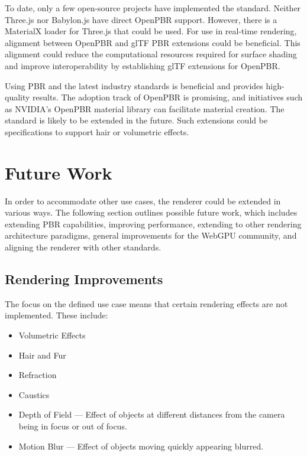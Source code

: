 To date, only a few open-source projects have implemented the standard. Neither \gls{Three.js} nor \gls{Babylon.js} have direct \gls{OpenPBR} support. However, there is a \gls{MaterialX} loader for \gls{Three.js} that could be used. For use in real-time rendering, alignment between \gls{OpenPBR} and \gls{glTF} \gls{PBR} extensions could be beneficial. This alignment could reduce the computational resources required for surface shading and improve interoperability by establishing \gls{glTF} extensions for \gls{OpenPBR}.

Using \gls{PBR} and the latest industry standards is beneficial and provides high-quality results. The adoption track of \gls{OpenPBR} is promising, and initiatives such as NVIDIA's \gls{OpenPBR} material library \cite{omniverseOpenPBR} can facilitate material creation. The standard is likely to be extended in the future. Such extensions could be specifications to support hair or volumetric effects.

\section{Future Work}

In order to accommodate other use cases, the renderer could be extended in various ways. The following section outlines possible future work, which includes extending \gls{PBR} capabilities, improving performance, extending to other rendering architecture paradigms, general improvements for the \gls{WebGPU} community, and aligning the renderer with other standards.

\subsection*{Rendering Improvements}

The focus on the defined use case means that certain rendering effects are not implemented. These include:

\begin{itemize}
  \item{Volumetric Effects}
  \item{Hair and Fur}
  \item{Refraction}
  \item{Caustics}
  \item{Depth of Field} — Effect of objects at different distances from the camera being in focus or out of focus.
  \item{Motion Blur} — Effect of objects moving quickly appearing blurred.
\end{itemize}


